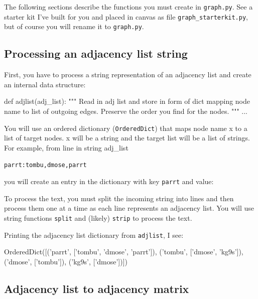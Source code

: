 \begin{fullwidth}
The following sections describe the functions you must create in {\tt graph.py}. See a starter kit I've built for you and placed in canvas as file {\tt graph\_starterkit.py}, but of course you will rename it to {\tt graph.py}.

\subsection{Processing an adjacency list string}

First, you have to process a string representation of an adjacency list and create an internal data structure:

\begin{pyverbatim}
def adjlist(adj_list):
    """
    Read in adj list and store in form of dict mapping node
    name to list of outgoing edges. Preserve the order you find
    for the nodes.
    """
    ...
\end{pyverbatim}

You will use an ordered dictionary ({\tt OrderedDict}) that maps node name x to a list of target nodes. x will be a string and the target list will be a list of strings. For example, from line in string adj\_list

\begin{alltt}
parrt: tombu, dmose, parrt
\end{alltt}

\noindent you will create an entry in the dictionary with key {\tt parrt} and value:

\begin{pyverbatim}
\end{pyverbatim}

\noindent To process the text, you must split the incoming string into lines and then process them one at a time as each line represents an adjacency list. You will use string functions {\tt split} and (likely) {\tt strip} to process the text.

\noindent Printing the adjacency list dictionary from {\tt adjlist}, I see:

\begin{pyverbatim}
OrderedDict([('parrt', ['tombu', 'dmose', 'parrt']),
 ('tombu', ['dmose', 'kg9s']), 
 ('dmose', ['tombu']), 
 ('kg9s', ['dmose'])])
\end{pyverbatim}

\subsection{Adjacency list to adjacency matrix}


\end{fullwidth}
